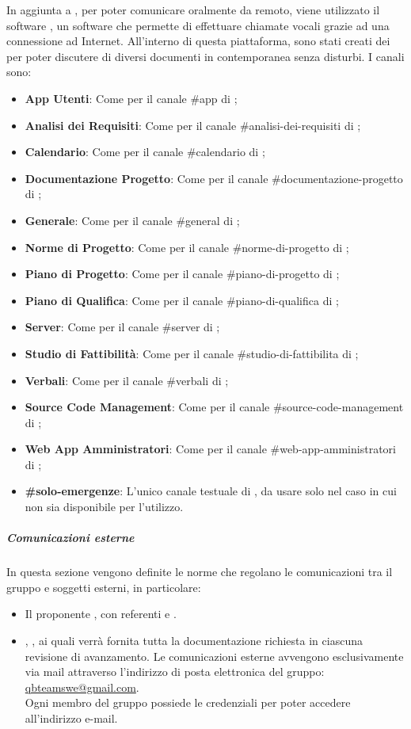 In aggiunta a , per poter comunicare oralmente da remoto, viene utilizzato il software , un software che permette di effettuare chiamate vocali grazie ad una connessione ad Internet.
All'interno di questa piattaforma, sono stati creati dei  per poter discutere di diversi documenti in contemporanea senza disturbi.
I canali sono:
\begin{itemize}
	\item \textbf{App Utenti}: Come per il canale \#app di ;
	\item \textbf{Analisi dei Requisiti}: Come per il canale \#analisi-dei-requisiti di ;
	\item \textbf{Calendario}: Come per il canale \#calendario di ;
	\item \textbf{Documentazione Progetto}: Come per il canale \#documentazione-progetto di ;
	\item \textbf{Generale}: Come per il canale \#general di ;
	\item \textbf{Norme di Progetto}: Come per il canale \#norme-di-progetto di ;
	\item \textbf{Piano di Progetto}: Come per il canale \#piano-di-progetto di ;
	\item \textbf{Piano di Qualifica}: Come per il canale \#piano-di-qualifica di ;
	\item \textbf{Server}: Come per il canale \#server di ;
	\item \textbf{Studio di Fattibilità}: Come per il canale \#studio-di-fattibilita di ;
	\item \textbf{Verbali}: Come per il canale \#verbali di ;
	\item \textbf{Source Code Management}: Come per il canale \#source-code-management di ;
	\item \textbf{Web App Amministratori}: Come per il canale \#web-app-amministratori di ;
	\item \textbf{\#solo-emergenze}: L'unico canale testuale di , da usare solo nel caso in cui  non sia disponibile per l'utilizzo.
\end{itemize}

\subparagraph*{Comunicazioni esterne}
In questa sezione vengono definite le norme che regolano le comunicazioni tra il gruppo e soggetti esterni, in particolare:
\begin{itemize}
	\item Il proponente \Proponente{}, con referenti \ZD{}{} e \CT{}.
	\item \VT{}, \CR{}, ai quali verrà fornita tutta la documentazione richiesta in ciascuna revisione di avanzamento.
	Le comunicazioni esterne avvengono esclusivamente via mail attraverso l’indirizzo di posta elettronica del gruppo:
	\url{qbteamswe@gmail.com}. \\
	Ogni membro del gruppo possiede le credenziali per poter accedere all’indirizzo e-mail.
\end{itemize}

